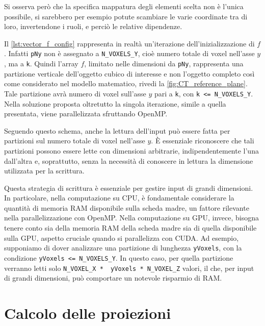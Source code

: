 \documentclass[12pt,a4paper]{report}
\begin{document}
Si osserva però che la specifica mappatura degli elementi scelta non è l'unica possibile, si sarebbero per esempio potute
scambiare le varie coordinate tra di loro, invertendone i ruoli, e perciò le relative dipendenze.

Il \autoref{lst:vector_f_config} rappresenta in realtà un'iterazione dell'inizializzazione di \(f\).
Infatti \lstinline{pNy} non è assegnato a \mbox{\lstinline{N_VOXELS_Y},} cioè numero totale di voxel nell'asse \(y\), ma a
\mbox{\lstinline{k}.}
Quindi l'array \(f\), limitato nelle dimensioni da \mbox{\lstinline{pNy},} rappresenta una partizione verticale dell'oggetto
cubico di interesse e non l'oggetto completo così come considerato nel modello matematico, rivedi la
\autoref{fig:CT_reference_plane}.
Tale partizione avrà numero di voxel sull'asse \(y\) pari a \mbox{\lstinline{k},} con \mbox{\lstinline{k <= N_VOXELS_Y}.}
Nella soluzione proposta oltretutto la singola iterazione, simile a quella presentata, viene parallelizzata sfruttando OpenMP.

Seguendo questo schema, anche la lettura dell'input può essere fatta per partizioni sul numero totale di voxel nell'asse \(y\).
È essenziale riconoscere che tali partizioni possono essere lette con dimensioni arbitrarie, indipendentemente l'una dall'altra e,
soprattutto, senza la necessità di conoscere in lettura la dimensione utilizzata per la scrittura.

Questa strategia di scrittura è essenziale per gestire input di grandi dimensioni.
In particolare, nella computazione su CPU, è fondamentale considerare la quantità di memoria RAM disponibile sulla scheda madre,
un fattore rilevante nella parallelizzazione con OpenMP.
Nella computazione su GPU, invece, bisogna tenere conto sia della memoria RAM della scheda madre sia di quella disponibile sulla
GPU, aspetto cruciale quando si parallelizza con CUDA.
Ad esempio, supponiamo di dover analizzare una partizione di lunghezza \mbox{\lstinline{yVoxels},} con la condizione
\mbox{\lstinline{yVoxels <= N_VOXELS_Y}.}
In questo caso, per quella partizione verranno letti solo \lstinline{N_VOXEL_X *  yVoxels * N_VOXEL_Z} valori, il che, per input
di grandi dimensioni, può comportare un notevole risparmio di RAM.

\section{Calcolo delle proiezioni}
\end{document}
